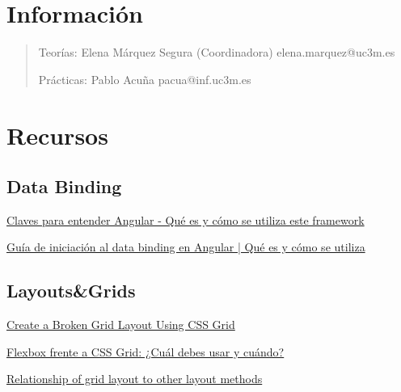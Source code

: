 \documentclass[12pt]{report} %
\begin{document}
\listoffigures
\thispagestyle{fancy}

\listoftables
\thispagestyle{fancy}

\clearpage
{} %



\section{Información}
\begin{quote}
Teorías: Elena Márquez Segura (Coordinadora) elena.marquez@uc3m.es

Prácticas: Pablo Acuña pacua@inf.uc3m.es
\end{quote}

\section{Recursos}

\subsection{Data Binding}
\href{https://www.acontracorrientech.com/claves-para-entender-angular-que-es-y-como-se-utiliza/}{Claves para entender Angular - Qué es y cómo se utiliza este framework}

\href{https://www.acontracorrientech.com/guia-practica-del-databinding-en-angular/}{Guía de iniciación al data binding en Angular | Qué es y cómo se utiliza}

\subsection{Layouts\&Grids}
\href{https://webdesign.tutsplus.com/tutorials/create-a-broken-grid-layout-using-css-grid--cms-30870}{Create a Broken Grid Layout Using CSS Grid}

\href{https://webdesign.tutsplus.com/es/articles/flexbox-vs-css-grid-which-should-you-use--cms-30184}{Flexbox frente a CSS Grid: ¿Cuál debes usar y cuándo?}

\href{https://developer.mozilla.org/en-US/docs/Web/CSS/CSS_Grid_Layout/Relationship_of_Grid_Layout#grid_and_flexbox}{Relationship of grid layout to other layout methods}
\end{document}
